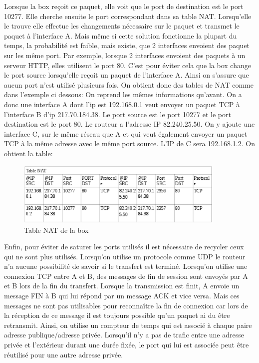 Lorsque la box reçoit ce paquet, elle voit que le port de destination est le
port 10277. Elle cherche ensuite le port correspondant dans sa table NAT.
Lorsqu'elle le trouve elle effectue les changements nécessaire sur le paquet et
transmet le paquet à l'interface A.
\newline
Mais même si cette solution fonctionne la plupart du temps, la probabilité est
faible, mais existe, que 2 interfaces envoient des paquet sur les même port. Par exemple,
lorsque 2 interfaces envoient des paquets à un serveur HTTP, elles utilisent le port 80. 
C'est pour éviter cela que la box change le port source lorsqu'elle reçoit un paquet de
l'interface A. Ainsi on s'assure que aucun port n'est utilisé plusieurs fois.
On obtient donc des tables de NAT comme dans l'exemple ci dessous:
\newline
On reprend les mêmes informations qu'avant. On a donc une interface A dont l'ip
est 192.168.0.1 veut envoyer un paquet TCP à l'interface B d'ip 217.70.184.38.
Le port source est le port 10277 et le port destination est le port 80. Le
routeur a l'adresse IP  82.240.25.50.
On y ajoute une interface C, sur le même réseau que A et qui veut également
envoyer un paquet TCP à la même adresse avec le même port source. L'IP de C
sera 192.168.1.2.
On obtient la table:

\begin{figure}[h]
\centering
\includegraphics[width=10cm]{./pics/TableNAT2.eps}
\caption{Table NAT de la box}
\label{fig:NAT2}
\end{figure}

Enfin, pour éviter de saturer les ports utilisés il est nécessaire de recycler
 ceux qui ne sont plus utilisés. Lorsqu'on utilise un protocole comme UDP le
routeur n'a aucune possibilité de savoir si le transfert est terminé. Lorsqu'on
utilise une connexion TCP entre A et B, des messages de fin de session sont
envoyés par A et B lors de la fin du transfert. Lorsque la transmission est
finit, A envoie un message FIN à B qui lui répond par un message ACK et vice
versa. Mais ces messages ne sont pas utilisables pour reconnaître la fin de
connexion car lors de la réception de ce message il est toujours possible qu'un
paquet ai du être retransmit. Ainsi, on utilise un compteur de temps qui est
associé à chaque paire adresse publique/adresse privée. Lorsqu'il n'y a pas de
trafic entre une adresse privée et l'extérieur durant une durée fixée, le port
qui lui est associée peut être réutilisé pour une autre adresse privée.

